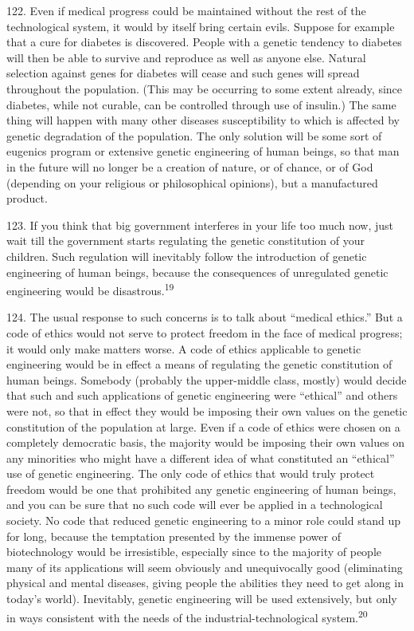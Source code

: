 \documentclass{article}
\begin{document}
122.  Even if medical progress could be maintained without the rest of the technological system, 
it would by itself bring certain evils.  Suppose for example that a cure for diabetes is 
discovered.  People with a genetic tendency to diabetes will then be able to survive and reproduce 
as well as anyone else.  Natural selection against genes for diabetes will cease and such genes will 
spread throughout the population.  (This may be occurring to some extent already, since diabetes, 
while not curable, can be controlled through use of insulin.) The same thing will happen with many 
other  diseases  susceptibility  to  which  is  affected  by  genetic  degradation  of  the  population.   The 
only solution will be some sort of eugenics program or extensive genetic engineering of human 
beings, so that man in the future will no longer be a creation of nature, or of chance, or of God 
(depending on your religious or philosophical opinions), but a manufactured product. \vspace{\baselineskip}

123.  If  you  think  that  big  government  interferes  in  your  life  too  much  now,  just  wait  till  the  
government  starts  regulating  the  genetic  constitution  of  your  children.   Such  regulation  will  
inevitably follow the introduction of genetic engineering of human beings, because the 
consequences of unregulated genetic engineering would be disastrous.\textsuperscript{19} \vspace{\baselineskip}

124.  The usual response to such concerns is to talk about “medical ethics.” But a code of ethics 
would not serve to protect freedom in the face of medical progress; it would only make matters 
worse.  A code of ethics applicable to genetic engineering would be in effect a means of regulating 
the genetic constitution of human beings.  Somebody (probably the upper-middle class, mostly) 
would  decide  that  such  and  such  applications  of  genetic  engineering  were  “ethical”  and  others  
were not, so that in effect they would be imposing their own values on the genetic constitution of 
the population at large.  Even if a code of ethics were chosen on a completely democratic basis, 
the majority would be imposing their own values on any minorities who  might have a different 
idea  of  what  constituted  an  “ethical”  use  of  genetic  engineering.   The  only  code  of  ethics  that  
would  truly  protect  freedom  would  be  one  that  prohibited  any  genetic  engineering  of  human  
beings, and you can be sure that no such code will ever be applied in a technological society.  No 
code  that  reduced  genetic  engineering  to  a  minor  role  could  stand  up  for  long,  because  the  
temptation  presented  by  the  immense  power  of  biotechnology  would  be  irresistible,  especially  
since  to  the  majority  of  people  many  of  its  applications  will  seem  obviously  and  unequivocally  
good (eliminating physical and mental diseases, giving people the abilities they need to get along 
in  today’s  world).   Inevitably,  genetic  engineering  will  be  used  extensively,  but  only  in  ways  
consistent with the needs of the industrial-technological system.\textsuperscript{20}
\end{document}

